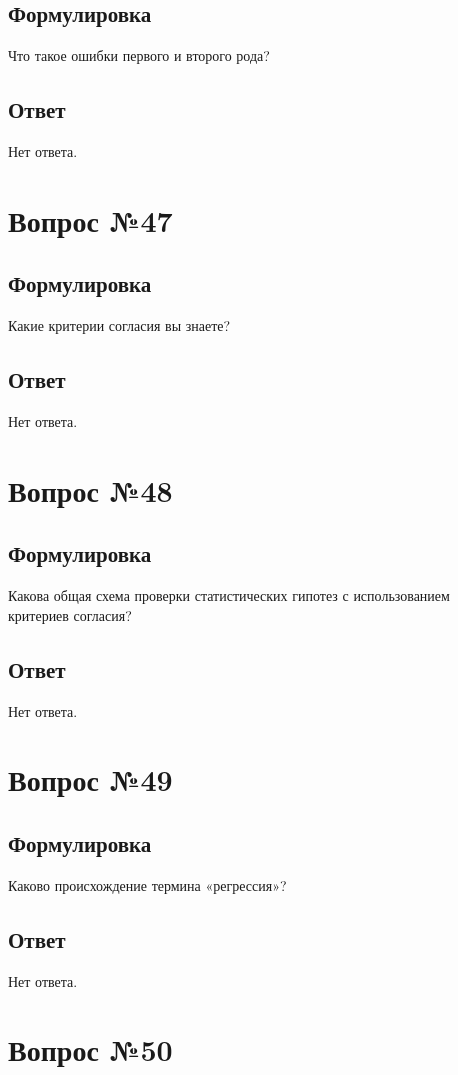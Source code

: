 \documentclass[a4]{article}
\begin{document}
	\subsection*{Формулировка}
	Что такое ошибки первого и второго рода?
	\subsection*{Ответ}
	Нет ответа.
	
	\section{Вопрос №47}
	\subsection*{Формулировка}
	Какие критерии согласия вы знаете?
	\subsection*{Ответ}
	Нет ответа.
	
	\section{Вопрос №48}
	\subsection*{Формулировка}
	Какова общая схема проверки статистических гипотез с использованием критериев
согласия?
	\subsection*{Ответ}
	Нет ответа.
	
	\section{Вопрос №49}
	\subsection*{Формулировка}
	Каково происхождение термина «регрессия»?
	\subsection*{Ответ}
	Нет ответа.
	
	\section{Вопрос №50}
\end{document}
